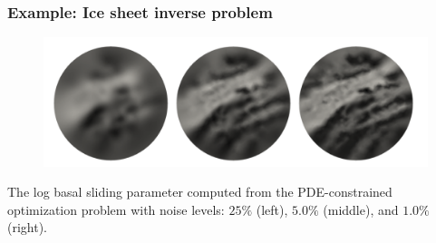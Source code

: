 \documentclass[10pt,final,xcolor=dvipsnames]{beamer}
\begin{document}
\begin{frame}
  \frametitle{Example: Ice sheet inverse problem}

  \begin{figure}
    \centering\includegraphics[scale=0.6]{extraplots/reconstructions-ice.png}
  \end{figure}
  \begin{center}
    The log basal sliding parameter computed from the PDE-constrained
    optimization problem with noise levels: $25\%$ (left), $5.0\%$
    (middle), and $1.0\%$ (right).
  \end{center}
\end{frame}
\end{document}
